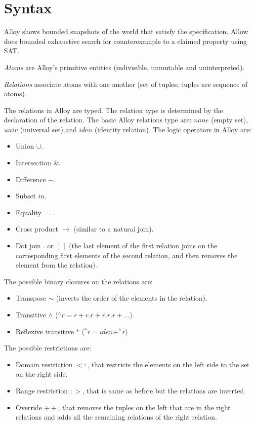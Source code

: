 \documentclass[12pt, a4paper]{report}
\newtheorem[style=M,bodystyle=\normalfont]{theorem}{Theorem}
\newtheorem[style=M,bodystyle=\normalfont]{corollary}{Corollary}
\newtheorem[style=M,bodystyle=\normalfont]{lemma}{Lemma}
\newtheorem[style=M,bodystyle=\normalfont]{definition}{Definition}
\begin{document}
    \section{Syntax}
        Alloy shows bounded snapshots of the world that satisfy the specification. Allow does bounded exhaustive search for counterexample to a claimed property using SAT.
        \begin{definition}
            \emph{Atoms} are Alloy's primitive entities (indivisible, immutable and uninterpreted). 
        \end{definition}
        \begin{definition}
            \emph{Relations} associate atoms with one another (set of tuples; tuples are sequence of atoms).
        \end{definition}
        The relations in Alloy are typed. The relation type is determined by the declaration of the relation. The basic Alloy relations type are: $none$ (empty set), $univ$ (universal set) and $iden$ (identity relation). The logic operators in Alloy are: 
        \begin{itemize}
            \item Union $\cup$.
            \item Intersection $\&$.
            \item Difference $-$.
            \item Subset $in$.
            \item Equality $=$.
            \item Cross product $\rightarrow$ (similar to a natural join). 
            \item Dot join $.$ or $[\:]$ (the last element of the first relation joins on the corresponding first elements of the second relation, and then removes the element from the relation).
        \end{itemize}
        The possible binary closures on the relations are: 
        \begin{itemize}
            \item Transpose $\sim$ (inverts the order of the elements in the relation).
            \item Transitive $\land$ ($^{\land}r=r+r.r+r.r.r+\dots$). 
            \item Reflexive transitive $*$ ($^{*}r=iden+^{\land}r$)
        \end{itemize}
        The possible restrictions are: 
        \begin{itemize}
            \item Domain restriction $<:$, that restricts the elements on the left side to the set on the right side.
            \item Range restriction $:>$, that is same as before but the relations are inverted. 
            \item Override $++$, that removes the tuples on the left that are in the right relations and adds all the remaining relations of the right relation. 
        \end{itemize}
\end{document}
